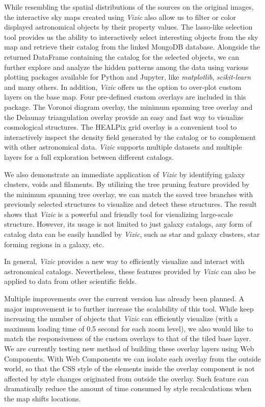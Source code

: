 \documentclass[5p,authoryear]{elsarticle}
\begin{document}
While resembling the spatial distributions of the sources on the original images, the interactive sky maps created using \textit{Vizic} also allow us to filter or color displayed astronomical objects by their property values.
The lasso-like selection tool provides us the ability to interactively select interesting objects from the sky map and retrieve their catalog from the linked MongoDB database.
Alongside the returned DataFrame containing the catalog for the selected objects, we can further explore and analyze the hidden patterns among the data using various plotting packages available for Python and Jupyter, like \textit{matplotlib}, \textit{scikit-learn} and many others.
In addition, \textit{Vizic} offers us the option to over-plot custom layers on the base map. Four pre-defined custom overlays are included in this package.
The Voronoi diagram overlay, the minimum spanning tree overlay and the Delaunay triangulation overlay provide an easy and fast way to visualize cosmological structures.
The HEALPix grid overlay is a convenient tool to interactively inspect the density field generated by the catalog or to complement with other astronomical data. \textit{Vizic} supports multiple datasets and multiple layers for a full exploration between different catalogs.

We also demonstrate an immediate application of \textit{Vizic} by identifying galaxy clusters, voids and filaments. By utilizing the tree pruning feature provided by the minimum spanning tree overlay, we can match the saved tree branches with previously selected structures to visualize and detect these structures.
The result shows that \textit{Vizic} is a powerful and friendly tool for visualizing large-scale structure. However, its usage is not limited to just galaxy catalogs, any form of catalog data can be easily handled by \textit{Vizic}, such as star and galaxy clusters, star forming regions in a galaxy, etc.

In general, \textit{Vizic} provides a new way to efficiently visualize and interact with astronomical catalogs. Nevertheless, these features provided by \textit{Vizic} can also be applied to data from other scientific fields.

Multiple improvements over the current version has already been planned.
A major improvement is to further increase the scalability of this tool.
While keep increasing the number of objects that \textit{Vizic} can efficiently visualize (with a maximum loading time of 0.5 second for each zoom level), we also would like to match the responsiveness of the custom overlays to that of the tiled base layer.
We are currently testing new method of building these overlay layers using Web Components.
With Web Components we can isolate each overlay from the outside world, so that the CSS style of the elements inside the overlay component is not affected by style changes originated from outside the overlay.
Such feature can dramatically reduce the amount of time consumed by style recalculations when the map shifts locations.
\end{document}
